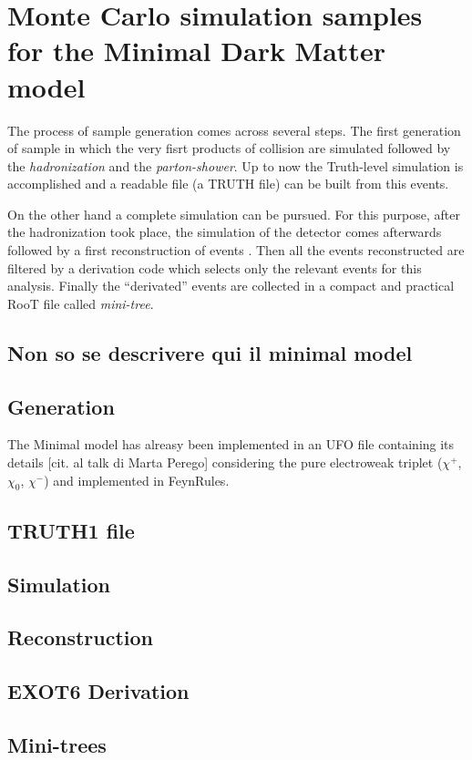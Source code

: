 \chapter[Monte Carlo simulation]{Monte Carlo simulation samples for the Minimal Dark Matter model}

The process of sample generation comes across several steps. The first generation of sample in which the very fisrt products of \pp collision are simulated followed by the \emph{hadronization} and the \emph{parton-shower}. Up to now the Truth-level simulation is accomplished and a readable file (a TRUTH file) can be built from this events. 

On the other hand a complete simulation can be pursued. For this purpose, after the hadronization took place, the simulation of the detector comes afterwards followed by a first reconstruction of events . Then all the events reconstructed are filtered by a derivation code which selects only the  relevant events for this analysis. Finally the ``derivated'' events are collected in a compact and practical RooT file called \emph{mini-tree}.

\section{Non so se descrivere qui il minimal model}

\section{Generation}
The Minimal model has alreasy been implemented in an UFO file containing its details [cit. al talk di Marta Perego] considering the pure electroweak triplet ($\chi^+$,$\chi_0$, $\chi^-$) and implemented in FeynRules. 

\section{TRUTH1 file}
\lipsum

\section{Simulation}
\lipsum

\section{Reconstruction}
\lipsum

\section{EXOT6 Derivation}
\lipsum

\section{Mini-trees}
\lipsum